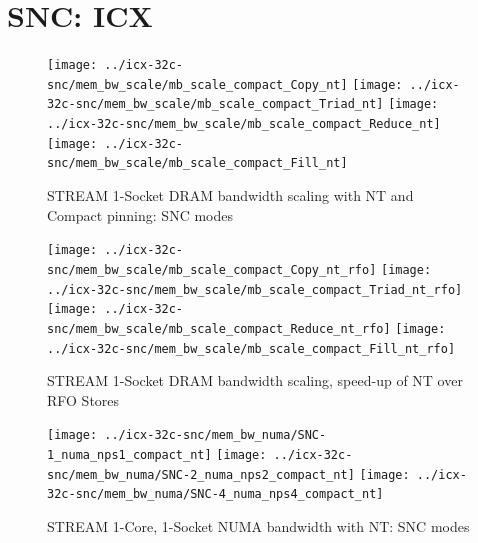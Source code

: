 \documentclass{article}
\begin{document}
\clearpage
\section{SNC: ICX}
\begin{figure}[!ht]
    \centering
    \texttt{[image: ../icx-32c-snc/mem\_bw\_scale/mb\_scale\_compact\_Copy\_nt]}
    \texttt{[image: ../icx-32c-snc/mem\_bw\_scale/mb\_scale\_compact\_Triad\_nt]}
    \texttt{[image: ../icx-32c-snc/mem\_bw\_scale/mb\_scale\_compact\_Reduce\_nt]}
    \texttt{[image: ../icx-32c-snc/mem\_bw\_scale/mb\_scale\_compact\_Fill\_nt]}
    \caption{STREAM 1-Socket DRAM bandwidth scaling with NT and Compact pinning: SNC modes}
    \label{figure:mem_bw_scale_compact_NT_icx_snc}
\end{figure}
\begin{figure}[!ht]
    \centering
    \texttt{[image: ../icx-32c-snc/mem\_bw\_scale/mb\_scale\_compact\_Copy\_nt\_rfo]}
    \texttt{[image: ../icx-32c-snc/mem\_bw\_scale/mb\_scale\_compact\_Triad\_nt\_rfo]}
    \texttt{[image: ../icx-32c-snc/mem\_bw\_scale/mb\_scale\_compact\_Reduce\_nt\_rfo]}
    \texttt{[image: ../icx-32c-snc/mem\_bw\_scale/mb\_scale\_compact\_Fill\_nt\_rfo]}
    \caption{STREAM 1-Socket DRAM bandwidth scaling, speed-up of NT over RFO Stores}
    \label{figure:mem_bw_scale_compact_nt_rfo_icx_snc}
\end{figure}

\begin{figure}[!ht]
    \centering
    \texttt{[image: ../icx-32c-snc/mem\_bw\_numa/SNC-1\_numa\_nps1\_compact\_nt]}
    \texttt{[image: ../icx-32c-snc/mem\_bw\_numa/SNC-2\_numa\_nps2\_compact\_nt]}
    \texttt{[image: ../icx-32c-snc/mem\_bw\_numa/SNC-4\_numa\_nps4\_compact\_nt]}
    \caption{STREAM 1-Core, 1-Socket NUMA bandwidth with NT: SNC modes}
    \label{figure:mem_bw_numa_nt_icx_snc}
\end{figure}

\clearpage
\end{document}
